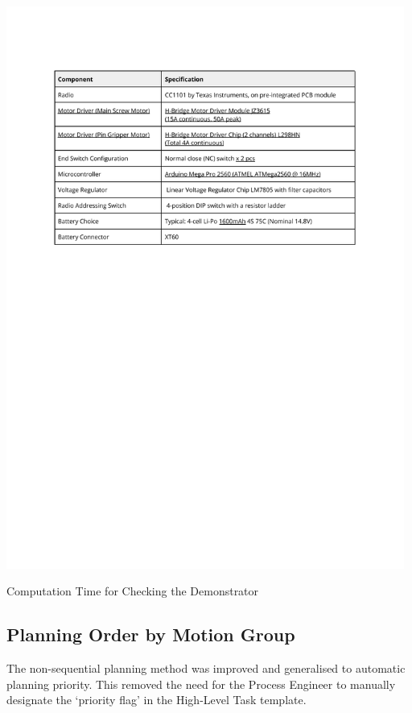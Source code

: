 \begin{table}[!h]
    \includegraphics[page=2, trim=25.4mm 240mm 25.4mm 33mm, clip, width=0.98\textwidth]{tables/Tables in Chapter 7.pdf}
    \caption{Computation Time for Checking the Demonstrator}
    \label{table:computation-time-for-checking}
\end{table}

\FloatBarrier

\subsection{Planning Order by Motion Group}
\label{subsection:exploration-4-planning-order-by-motion-group}

The non-sequential planning method  was improved and generalised to automatic planning priority. This removed the need for the Process Engineer to manually designate the ‘priority flag’ in the High-Level Task template. 

